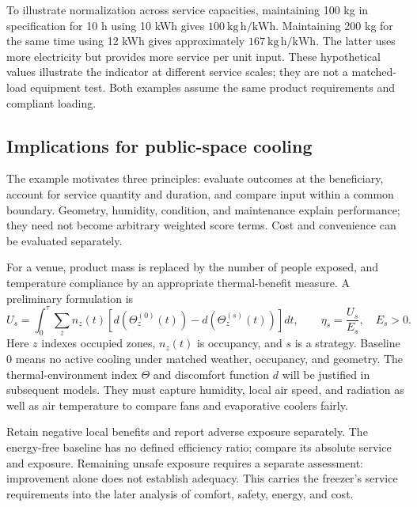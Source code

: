 \documentclass[12pt]{article}
\begin{document}
To illustrate normalization across service capacities, maintaining 100 kg in specification for 10 h using 10 kWh gives $100\ \mathrm{kg\,h/kWh}$. Maintaining 200 kg for the same time using 12 kWh gives approximately $167\ \mathrm{kg\,h/kWh}$. The latter uses more electricity but provides more service per unit input. These hypothetical values illustrate the indicator at different service scales; they are not a matched-load equipment test. Both examples assume the same product requirements and compliant loading.

\subsection{Implications for public-space cooling}

The example motivates three principles: evaluate outcomes at the beneficiary, account for service quantity and duration, and compare input within a common boundary. Geometry, humidity, condition, and maintenance explain performance; they need not become arbitrary weighted score terms. Cost and convenience can be evaluated separately.

For a venue, product mass is replaced by the number of people exposed, and temperature compliance by an appropriate thermal-benefit measure. A preliminary formulation is
\begin{equation}
U_s=\int_0^\tau\sum_z n_z(t)
\left[d\!\left(\Theta_z^{(0)}(t)\right)
-d\!\left(\Theta_z^{(s)}(t)\right)\right]dt,
\qquad \eta_s=\frac{U_s}{E_s},\quad E_s>0.
\label{eq:people}
\end{equation}
Here $z$ indexes occupied zones, $n_z(t)$ is occupancy, and $s$ is a strategy. Baseline $0$ means no active cooling under matched weather, occupancy, and geometry. The thermal-environment index $\Theta$ and discomfort function $d$ will be justified in subsequent models. They must capture humidity, local air speed, and radiation as well as air temperature to compare fans and evaporative coolers fairly.

Retain negative local benefits and report adverse exposure separately. The energy-free baseline has no defined efficiency ratio; compare its absolute service and exposure. Remaining unsafe exposure requires a separate assessment: improvement alone does not establish adequacy. This carries the freezer's service requirements into the later analysis of comfort, safety, energy, and cost.
\end{document}
